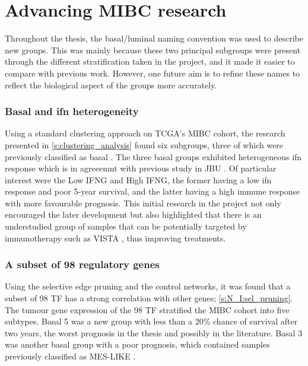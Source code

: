 \section{Advancing MIBC research}

Throughout the thesis, the basal/luminal naming convention was used to describe new groups. This was mainly because these two principal subgroups were present through the different stratification taken in the project, and it made it easier to compare with previous work. However, one future aim is to refine these names to reflect the biological aspect of the groups more accurately.

\subsubsection*{Basal and \acrlong{ifn} heterogeneity}

Using a standard clustering approach on TCGA's MIBC cohort, the research presented in \cref{s:clustering_analysis} found six subgroups, three of which were previously classified as basal \citep{Kamoun2020-tj, Robertson2017-mg, Marzouka2018-ge}. The three basal groups exhibited heterogeneous \acrshort{ifn} response which is in agreeemnt with previous study in JBU \citep{Baker2022-bj}. Of particular interest were the Low IFNG and High IFNG, the former having a low \acrshort{ifn} response and poor 5-year survival, and the latter having a high immune response with more favourable prognosis. This initial research in the project not only encouraged the later development but also highlighted that there is an understudied group of samples that can be potentially targeted by immunotherapy such as VISTA \citep{Baker2022-bj}, thus improving treatments.


\subsubsection*{A subset of 98 regulatory genes}

Using the selective edge pruning and the control networks, it was found that a subset of 98 TF has a strong correlation with other genes; \cref{s:N_I:sel_pruning}. The tumour gene expression of the 98 TF stratified the MIBC cohort into five subtypes. Basal 5 was a new group with less than a 20\% chance of survival after two years, the worst prognosis in the thesis and possibly in the literature. Basal 3 was another basal group with a poor prognosis, which contained samples previously classified as \gls{MES-LIKE} \citep{Marzouka2018-ge}.


